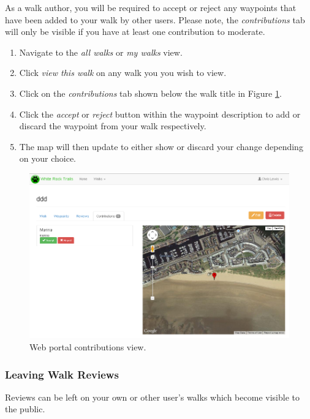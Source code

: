 \documentclass[11pt,a4paper]{report}
\begin{document}
As a walk author, you will be required to accept or reject any waypoints that have been added to your walk by other users. Please note, the \emph{contributions} tab will only be visible if you have at least one contribution to moderate.

\begin{enumerate}
\item Navigate to the \emph{all walks} or \emph{my walks} view.
\item Click \emph{view this walk} on any walk you you wish to view.
\item Click on the \emph{contributions} tab shown below the walk title in Figure \ref{fig:waypoint-contributions-guide}.
\item Click the \emph{accept} or \emph{reject} button within the waypoint description to add or discard the waypoint from your walk respectively.
\item The map will then update to either show or discard your change depending on your choice.
\end{enumerate}

\begin{figure}[H]
\centering
\includegraphics[width=0.8\linewidth]{./img/webportal/waypoint-contributions}
\caption{Web portal contributions view.}
\label{fig:waypoint-contributions-guide}
\end{figure}

\subsubsection{Leaving Walk Reviews}

Reviews can be left on your own or other user's walks which become visible to the public.
\end{document}
